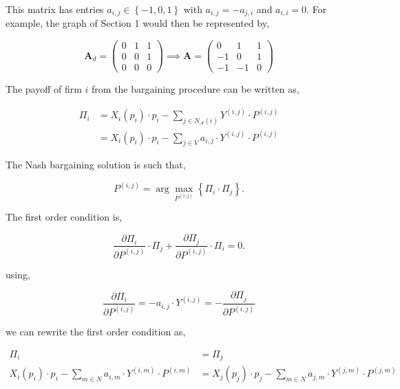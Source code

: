 \documentclass[american]{scrartcl}
\newcommand{\matr}[1]{\bm{#1}}
\newcommand{\set}[1]{\left\{#1\right\}}
\begin{document}
This matrix has entries $a_{i, j} \in \set{-1, 0, 1}$ with $a_{i, j} = - a_{j, i}$ and $a_{i, i} = 0$. For example, the graph of Section 1 would then be represented by,

\begin{equation}
	\matr{A}_d= \begin{pmatrix}
		0 & 1 & 1 \\
		0 & 0 & 1 \\
		0 & 0 & 0
	\end{pmatrix} \implies
	\matr{A} = \begin{pmatrix}
		0  & 1  & 1 \\
		-1 & 0  & 1 \\
		-1 & -1 & 0
	\end{pmatrix}
\end{equation}

The payoff of firm $i$ from the bargaining procedure can be written as,

\begin{equation}
	\begin{split}
		\Pi_i &= X_i(p_i)\cdot p_i - \sum_{j \in N_{\mathcal{A}}(i)} Y^{(i, j)} \cdot P^{(i, j)} \\
		&= X_i(p_i)\cdot p_i - \sum_{j \in V} a_{i, j} \cdot Y^{(i, j)} \cdot P^{(i, j)}
	\end{split}
\end{equation}

The Nash bargaining solution is such that,

\begin{equation}
	P^{(i, j)} = \arg \max_{P^{(i, j)}} \left\{\Pi_i \cdot \Pi_j \right\}.
\end{equation}

The first order condition is,

\begin{equation}
	\frac{\partial\Pi_i}{\partial P^{(i, j)}} \cdot \Pi_j + \frac{\partial\Pi_j}{\partial P^{(i, j)}} \cdot \Pi_i = 0.
\end{equation}

using,

\begin{equation}
	\frac{\partial\Pi_i}{\partial P^{(i, j)}} = - a_{i, j} \cdot Y^{(i, j)} = -\frac{\partial \Pi_j}{\partial P^{(i, j)}}
\end{equation}

we can rewrite the first order condition as,

\begin{equation} \label{foc_2}
	\begin{split}
		\Pi_i &= \Pi_j \\
		X_i(p_i)\cdot p_i - \sum_{m \in N} a_{i, m} \cdot Y^{(i, m)} \cdot P^{(i, m)} &= X_j(p_j)\cdot p_j - \sum_{m \in N} a_{j, m} \cdot Y^{(j, m)} \cdot P^{(j, m)}
	\end{split}
\end{equation}
\end{document}
